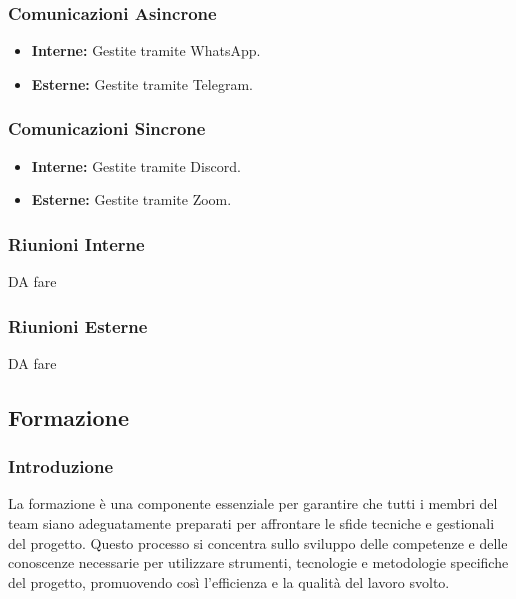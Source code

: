 \subsubsection{Comunicazioni Asincrone}
\begin{itemize}
    \item \textbf{Interne:} Gestite tramite WhatsApp.
    \item \textbf{Esterne:} Gestite tramite Telegram.
\end{itemize}

\subsubsection{Comunicazioni Sincrone}
\begin{itemize}
    \item \textbf{Interne:} Gestite tramite Discord.
    \item \textbf{Esterne:} Gestite tramite Zoom.
\end{itemize}

\subsubsection{Riunioni Interne}
DA fare
\subsubsection{Riunioni Esterne}
DA fare

\subsection{Formazione}
\subsubsection{Introduzione}
La formazione è una componente essenziale per garantire che tutti i membri del team siano adeguatamente preparati per affrontare le sfide tecniche e gestionali del progetto. Questo processo si concentra sullo sviluppo delle competenze e delle conoscenze necessarie per utilizzare strumenti, tecnologie e metodologie specifiche del progetto, promuovendo così l’efficienza e la qualità del lavoro svolto.

